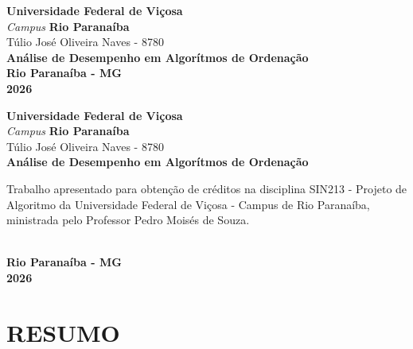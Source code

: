 \documentclass[12pt,arial]{article}
\author{[Túlio José Oliveira Naves]}
\begin{document}
	\begin{titlepage}
		\begin{center}
			\textbf{Universidade Federal de Viçosa}
			\textit{\\Campus}
			\textbf{Rio Paranaíba}
			\textnormal{\\\vspace{4cm} Túlio José Oliveira Naves - 8780}
			\textbf{\\\vspace{5cm}Análise de Desempenho em Algorítmos de Ordenação}
			\textbf{\\\vspace{9cm}Rio Paranaíba - MG \\ 2026}
		\end{center}
	\end{titlepage}
	
		\begin{titlepage}
			\begin{center}
				\textbf{Universidade Federal de Viçosa}
				\textit{\\Campus}
				\textbf{Rio Paranaíba}
				\textnormal{\\\vspace{3cm}Túlio José Oliveira Naves - 8780}
				\textbf{\\\vspace{4cm}Análise de Desempenho em Algorítmos de Ordenação\vspace{3cm}}
					\begin{flushright}
						\begin{minipage}{.5\textwidth}
							\textnormal{Trabalho apresentado para obtenção de créditos na disciplina SIN213 - Projeto de Algoritmo da Universidade Federal de Viçosa - Campus de Rio Paranaíba, ministrada pelo Professor Pedro Moisés de Souza.}
						\end{minipage}
					\end{flushright}
					
				\textbf{\\\vspace{3cm}Rio Paranaíba - MG \\ 2026}
				
			\end{center}
		\end{titlepage}
		
		
		\section{RESUMO}
		
		\newpage
\end{document}

